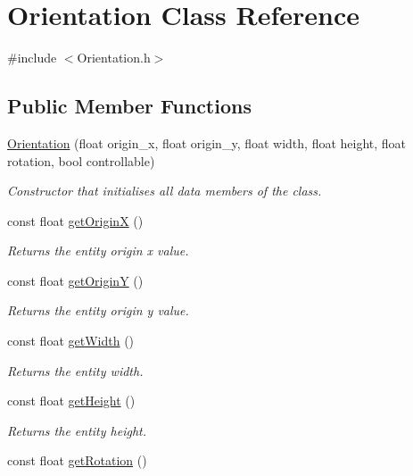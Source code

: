 \hypertarget{classOrientation}{\section{Orientation Class Reference}
\label{classOrientation}
}


{\ttfamily \#include $<$Orientation.\-h$>$}

\subsection*{Public Member Functions}
\begin{DoxyCompactItemize}
\item 
\hyperlink{classOrientation_ae2df457b68375ea4915f7fa1c161b116}{Orientation} (float origin\-\_\-x, float origin\-\_\-y, float width, float height, float rotation, bool controllable)
\begin{DoxyCompactList}\small\item\em Constructor that initialises all data members of the class. \end{DoxyCompactList}\item 
const float \hyperlink{classOrientation_a4d6b853f2ac00965d29e5bc36b94c949}{get\-Origin\-X} ()
\begin{DoxyCompactList}\small\item\em Returns the entity origin x value. \end{DoxyCompactList}\item 
const float \hyperlink{classOrientation_ae60c88b0525d6e536a1a068d3a99f74c}{get\-Origin\-Y} ()
\begin{DoxyCompactList}\small\item\em Returns the entity origin y value. \end{DoxyCompactList}\item 
const float \hyperlink{classOrientation_adf3e031c3ce102233782e6fdeb976ef3}{get\-Width} ()
\begin{DoxyCompactList}\small\item\em Returns the entity width. \end{DoxyCompactList}\item 
const float \hyperlink{classOrientation_af7c9a2f7547c76ce2408ac6fefacf9e1}{get\-Height} ()
\begin{DoxyCompactList}\small\item\em Returns the entity height. \end{DoxyCompactList}\item 
const float \hyperlink{classOrientation_ab3568e037a7dc7799d557f2bc6a3cf7d}{get\-Rotation} ()

\end{DoxyCompactItemize}
